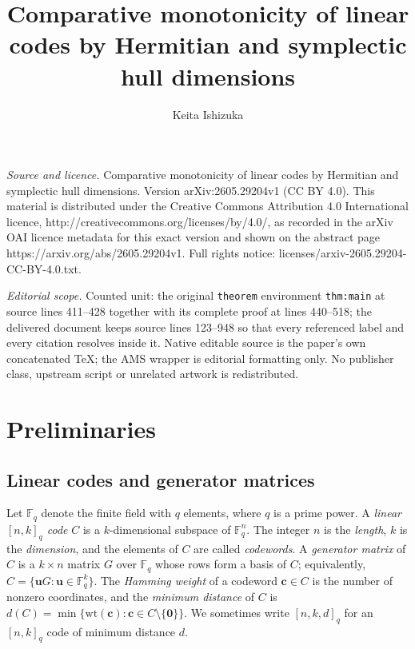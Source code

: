 \documentclass[10pt,a4paper]{amsart}
\newcommand{\F}{\mathbb{F}}
\begin{document}
\title[Comparative monotonicity of linear codes by Hermitian and sy]{Comparative monotonicity of linear codes by Hermitian and symplectic hull dimensions}
\author{Keita Ishizuka}
\date{}
\maketitle
\noindent\emph{Source and licence.} Comparative monotonicity of linear codes by Hermitian and symplectic hull dimensions. Version arXiv:2605.29204v1 (CC BY 4.0). This material is distributed under the Creative Commons Attribution 4.0 International licence, http://creativecommons.org/licenses/by/4.0/, as recorded in the arXiv OAI licence metadata for this exact version and shown on the abstract page https://arxiv.org/abs/2605.29204v1. Full rights notice: licenses/arxiv-2605.29204-CC-BY-4.0.txt.\par\smallskip
\noindent\textit{Editorial scope.} Counted unit: the original \texttt{theorem} environment \texttt{thm:main} at source lines 411--428 together with its complete proof at lines 440--518; the delivered document keeps source lines 123--948 so that every referenced label and every citation resolves inside it. Native editable source is the paper's own concatenated TeX; the AMS wrapper is editorial formatting only. No publisher class, upstream script or unrelated artwork is redistributed.
\section{Preliminaries} \label{sec:prelim}

\subsection{Linear codes and generator matrices}\label{sec:prelim-codes}

Let $\F_q$ denote the finite field with $q$ elements, where $q$ is a prime power.
A \emph{linear $[n, k]_q$ code} $C$ is a $k$-dimensional subspace of $\F_q^n$.
The integer $n$ is the \emph{length}, $k$ is the \emph{dimension}, and the elements of $C$
are called \emph{codewords}. A \emph{generator matrix} of $C$ is a $k \times n$ matrix
$G$ over $\F_q$ whose rows form a basis of $C$; equivalently, $C = \{\mathbf{u} G : \mathbf{u} \in \F_q^k\}$.
The \emph{Hamming weight} of a codeword $\mathbf{c} \in C$ is the number of nonzero coordinates,
and the \emph{minimum distance} of $C$ is $d(C) = \min\{\mathrm{wt}(\mathbf{c}) : \mathbf{c} \in C \setminus \{\mathbf{0}\}\}$.
We sometimes write $[n, k, d]_q$ for an $[n, k]_q$ code of minimum distance $d$.
\end{document}
